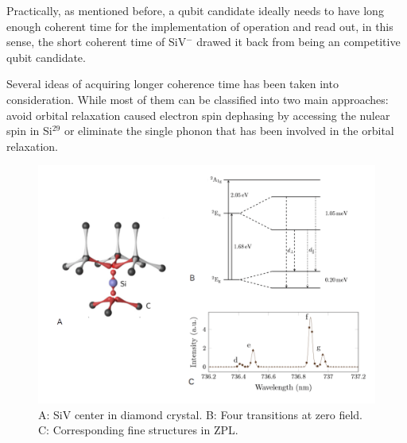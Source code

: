 Practically, as mentioned before, a qubit candidate ideally needs to have long enough coherent time for the implementation of operation and read out, in this sense, the short coherent time of SiV$^{-}$ drawed it back from being an competitive qubit candidate. 

Several ideas of acquiring longer coherence time has been taken into consideration. While most of them can be classified into two main approaches: avoid orbital relaxation caused electron spin dephasing by accessing the nulear spin in Si$^{29}$ \citep{dietrich_isotopically_2014}  or eliminate the single phonon that has been involved in the orbital relaxation.

\begin{figure}[h]
\centering
\includegraphics[width=1\linewidth]{Figures/pic/SiV}
\caption{A: SiV center in diamond crystal. B: Four transitions at zero field. C: Corresponding fine structures in ZPL. \citep{ristein_electronic_2000,rogers_all-optical_2014}}
\label{fig:wp20160921204025proli}
\end{figure}

